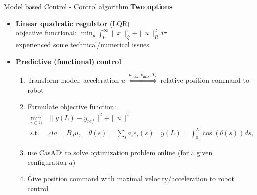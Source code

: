 \documentclass[
xcolor=dvipsnames,
aspectratio=169,
9pt,
]{beamer}
\begin{document}


\begin{frame}{Model based Control - Control algorithm}
\large{\textbf{Two options}}
\normalsize
\begin{itemize}
\item \textbf{Linear quadratic regulator} (LQR)\\
\vspace{1mm}
objective functional: $\min_u\int_0^\infty \|x\|_Q^2+\|u\|_R^2 d\tau$\\
\vspace{1mm}
experienced some technical/numerical issues 
\vspace{3mm}
\item \textbf{Predictive (functional) control}
\begin{enumerate}
\vspace{1mm}
\item Transform model: acceleration $u$ $\stackrel{a_{\max},v_{\max},T_s}{\Leftrightarrow}$ relative position command to robot
\vspace{1mm}
\item Formulate objective function: 
\begin{align*}
\min_{u\in\mathbb{U}}&\|y(L)-y_{ref}\|^2+\|u\|^2\\
\text{s.t. }&\Delta a=B_d u,\quad \theta(s)=\sum_i a_ie_i(s)
\quad  y(L)=\int_0^L \cos(\theta(s))ds,\quad %
\end{align*}
\vspace{1mm}
\item use CasADi to solve optimization problem online (for a given configuration $a$)
\vspace{1mm}
\item Give position command with maximal velocity/acceleration to robot control 
\end{enumerate}
\end{itemize}
\end{frame}
\end{document}

